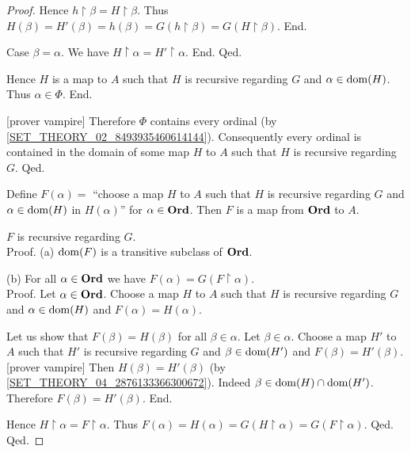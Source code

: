 \documentclass[../../set-theory/set-theory.tex]{subfiles}
\begin{document}
\begin{forthel}
\begin{proof}
              Hence $h \restriction \beta = H \restriction \beta$.
              Thus $H(\beta)
                = H'(\beta)
                = h(\beta)
                = G(h \restriction \beta)
                = G(H \restriction \beta)$.
            End.

            Case $\beta = \alpha$.
              We have $H \restriction \alpha = H' \restriction \alpha$.
            End.
          Qed.

          Hence $H$ is a map to $A$ such that $H$ is recursive regarding $G$ and
          $\alpha \in \operatorname{dom}(H)$.
          Thus $\alpha \in \Phi$.
        End.

        [prover vampire]
        Therefore $\Phi$ contains every ordinal (by
        \cref{SET_THEORY_02_8493935460614144}).
        Consequently every ordinal is contained in the domain of some map $H$ to
        $A$ such that $H$ is recursive regarding $G$.
      Qed.

      Define $F(\alpha) =$ ``choose a map $H$ to $A$ such that $H$ is recursive
      regarding $G$ and $\alpha \in \operatorname{dom}(H)$ in $H(\alpha)$'' for
      $\alpha \in \mathbf{Ord}$.
      Then $F$ is a map from $\mathbf{Ord}$ to $A$.

      $F$ is recursive regarding $G$. \\
      Proof.
        (a) $\operatorname{dom}(F)$ is a transitive subclass of $\mathbf{Ord}$.

        (b) For all $\alpha \in \mathbf{Ord}$ we have $F(\alpha) =
        G(F \restriction \alpha)$. \\
        Proof.
          Let $\alpha \in \mathbf{Ord}$.
          Choose a map $H$ to $A$ such that $H$ is recursive regarding $G$ and
          $\alpha \in \operatorname{dom}(H)$ and $F(\alpha) = H(\alpha)$.

          Let us show that $F(\beta) = H(\beta)$ for all $\beta \in \alpha$.
            Let $\beta \in \alpha$.
            Choose a map $H'$ to $A$ such that $H'$ is recursive regarding $G$
            and $\beta \in \operatorname{dom}(H')$ and $F(\beta) = H'(\beta)$.
            [prover vampire]
            Then $H(\beta) = H'(\beta)$ (by
            \cref{SET_THEORY_04_2876133366300672}).
            Indeed $\beta \in \operatorname{dom}(H) \cap \operatorname{dom}(H')$.
            Therefore $F(\beta) = H'(\beta)$.
          End.

          Hence $H \restriction \alpha = F \restriction \alpha$.
          Thus $F(\alpha)
            = H(\alpha)
            = G(H \restriction \alpha)
            = G(F \restriction \alpha)$.
        Qed.
      Qed.
    \end{proof}
  \end{forthel}
\end{document}
